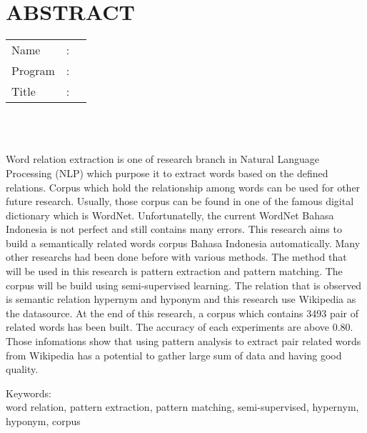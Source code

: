 %
%
%

	\chapter*{ABSTRACT}

\vspace*{0.2cm}

\noindent \begin{tabular}{l l p{11.0cm}}
	Name&: & \penulis \\
	Program&: & \programEng \\
	Title&: & \judulInggris \\
\end{tabular} \\ 

\vspace*{0.5cm}

\noindent 
\\ Word relation extraction is one of research branch in Natural Language Processing (NLP) which purpose it to extract words based on the defined relations. Corpus which hold the relationship among words can be used for other future research. Usually, those corpus can be found in one of the famous digital dictionary which is WordNet. Unfortunatelly, the current WordNet Bahasa Indonesia is not perfect and still contains many errors. This research aims to build a semantically related words corpus Bahasa Indonesia automatically. Many other researchs had been done before with various methods. The method that will be used in this research is pattern extraction and pattern matching. The corpus will be build using semi-supervised learning. The relation that is observed is semantic relation hypernym and hyponym and this research use Wikipedia as the datasource. At the end of this research, a corpus which contains 3493 pair of related words has been built. The accuracy of each experiments are above 0.80. Those infomations show that using pattern analysis to extract pair related words from Wikipedia has a potential to gather large sum of data and having good quality.

\vspace*{0.2cm}

\noindent Keywords: \\ 
\noindent  word relation, pattern extraction, pattern matching, semi-supervised, hypernym, hyponym, corpus \\
\newpage
